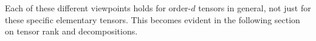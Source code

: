 \documentclass[../Lael_John_MasterThesis_Draft.tex]{subfiles}
\begin{document}
Each of these different viewpoints holds for order-$d$ tensors in general, not just for these specific elementary tensors. This becomes evident in the following section on tensor rank and decompositions.




\end{document}
